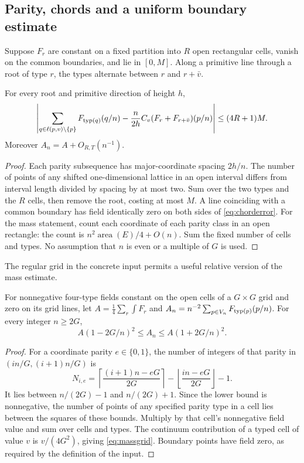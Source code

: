 \subsection{Parity, chords and a uniform boundary estimate}
Suppose \(F_r\) are constant on a fixed partition into \(R\) open
rectangular cells, vanish on the common boundaries, and lie in
\([0,M]\). Along a primitive line through a root of type \(r\), the
types alternate between \(r\) and \(r+\bar v\).

\begin{lemma}\label{lem:chord}
For every root and primitive direction of height \(h\),
\begin{equation}\label{eq:chorderror}
 \left|\sum_{q\in\ell(p,v)\setminus\{p\}}
 F_{\operatorname{typ}(q)}(q/n)
 -\frac n{2h}C_v(F_r+F_{r+\bar v})(p/n)\right|
 \le(4R+1)M.
\end{equation}
Moreover \(A_n=A+O_{R,T}(n^{-1})\).
\end{lemma}
\begin{proof}
Each parity subsequence has major-coordinate spacing \(2h/n\).
The number of points of any shifted one-dimensional lattice in an
open interval differs from interval length divided by spacing by at
most two. Sum over the two types and the \(R\) cells, then remove the
root, costing at most \(M\). A line coinciding with a common boundary
has field identically zero on both sides of \eqref{eq:chorderror}.
For the mass statement, count each coordinate of each parity class
in an open rectangle: the count is
\(n^2\operatorname{area}(E)/4+O(n)\). Sum the fixed number of cells
and types. No assumption that \(n\) is even or a multiple of \(G\)
is used.
\end{proof}

The regular grid in the concrete input permits a useful relative
version of the mass estimate.
\begin{lemma}\label{lem:massgrid}
For nonnegative four-type fields constant on the open cells of a
\(G\times G\) grid and zero on its grid lines, let
\(A=\tfrac14\sum_r\int F_r\) and
\(A_n=n^{-2}\sum_{p\in V_n}F_{\operatorname{typ}(p)}(p/n)\). For every integer
\(n\ge2G\),
\begin{equation}\label{eq:massgrid}
 A(1-2G/n)^2\le A_n\le A(1+2G/n)^2.
\end{equation}
\end{lemma}
\begin{proof}
For a coordinate parity \(e\in\{0,1\}\), the number of integers of
that parity in \((in/G,(i+1)n/G)\) is
\[
 N_{i,e}=\left\lceil\frac{(i+1)n-eG}{2G}\right\rceil
          -\left\lfloor\frac{in-eG}{2G}\right\rfloor-1.
\]
It lies between \(n/(2G)-1\) and \(n/(2G)+1\). Since the lower
bound is nonnegative, the number of points of any specified parity
type in a cell lies between the squares of these bounds. Multiply
by that cell's nonnegative field value and sum over cells and types.
The continuum contribution of a typed cell of value \(v\) is
\(v/(4G^2)\), giving \eqref{eq:massgrid}. Boundary points have field
zero, as required by the definition of the input.
\end{proof}

